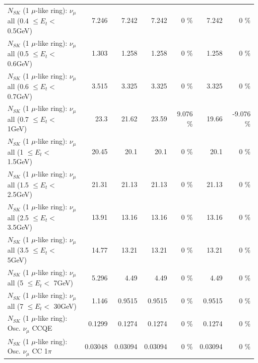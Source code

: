 \begin{table}
\begin{tabular}{| l | r | r | r  r | r  r |}
       $N_{SK}$ (1 $\mu$-like ring): $\nu_{\mu}$ all (0.4 $\leq E_{t} <$ 0.5GeV) &           7.246 &           7.242 &           7.242 &        0 \%  &           7.242 &        0 \%  \\ 
       $N_{SK}$ (1 $\mu$-like ring): $\nu_{\mu}$ all (0.5 $\leq E_{t} <$ 0.6GeV) &           1.303 &           1.258 &           1.258 &        0 \%  &           1.258 &        0 \%  \\ 
       $N_{SK}$ (1 $\mu$-like ring): $\nu_{\mu}$ all (0.6 $\leq E_{t} <$ 0.7GeV) &           3.515 &           3.325 &           3.325 &        0 \%  &           3.325 &        0 \%  \\ 
         $N_{SK}$ (1 $\mu$-like ring): $\nu_{\mu}$ all (0.7 $\leq E_{t} <$ 1GeV) &            23.3 &           21.62 &           23.59 &    9.076 \%  &           19.66 &   -9.076 \%  \\ 
         $N_{SK}$ (1 $\mu$-like ring): $\nu_{\mu}$ all (1 $\leq E_{t} <$ 1.5GeV) &           20.45 &            20.1 &            20.1 &        0 \%  &            20.1 &        0 \%  \\ 
       $N_{SK}$ (1 $\mu$-like ring): $\nu_{\mu}$ all (1.5 $\leq E_{t} <$ 2.5GeV) &           21.31 &           21.13 &           21.13 &        0 \%  &           21.13 &        0 \%  \\ 
       $N_{SK}$ (1 $\mu$-like ring): $\nu_{\mu}$ all (2.5 $\leq E_{t} <$ 3.5GeV) &           13.91 &           13.16 &           13.16 &        0 \%  &           13.16 &        0 \%  \\ 
         $N_{SK}$ (1 $\mu$-like ring): $\nu_{\mu}$ all (3.5 $\leq E_{t} <$ 5GeV) &           14.77 &           13.21 &           13.21 &        0 \%  &           13.21 &        0 \%  \\ 
           $N_{SK}$ (1 $\mu$-like ring): $\nu_{\mu}$ all (5 $\leq E_{t} <$ 7GeV) &           5.296 &            4.49 &            4.49 &        0 \%  &            4.49 &        0 \%  \\ 
          $N_{SK}$ (1 $\mu$-like ring): $\nu_{\mu}$ all (7 $\leq E_{t} <$ 30GeV) &           1.146 &          0.9515 &          0.9515 &        0 \%  &          0.9515 &        0 \%  \\ 
\hline
\hline
                               $N_{SK}$ (1 $\mu$-like ring): Osc. $\nu_\mu$ CCQE &          0.1299 &          0.1274 &          0.1274 &        0 \%  &          0.1274 &        0 \%  \\ 
                          $N_{SK}$ (1 $\mu$-like ring): Osc. $\nu_\mu$ CC 1$\pi$ &         0.03048 &         0.03094 &         0.03094 &        0 \%  &         0.03094 &        0 \%  \\ 

\end{tabular}
\end{table}
